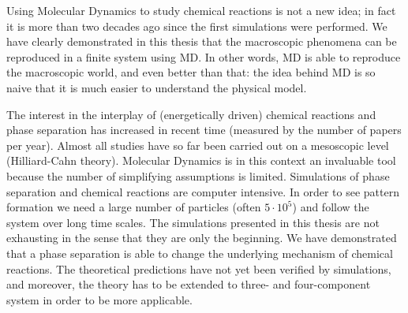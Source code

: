 Using Molecular Dynamics to study chemical reactions is not a new idea;
in fact it is more than two decades ago since the first simulations were
performed. We have clearly demonstrated in this thesis that the
macroscopic phenomena can be reproduced in a finite system using MD. In
other words, MD is able to reproduce the macroscopic world, and even
better than that: the idea behind MD is so naive that it is much
easier to understand the physical model.


The interest in the interplay of (energetically driven) chemical
reactions and phase separation has increased in recent time (measured
by the number of papers per year). Almost all studies have so far been
carried out on a mesoscopic level (Hilliard-Cahn theory). Molecular
Dynamics is in this context an invaluable tool because the number of
simplifying assumptions is limited. Simulations of phase separation and
chemical reactions are computer intensive. In order to see pattern
formation we need a large number of particles (often $5\cdot 10^5$)
and follow the system over long time scales. The simulations
presented in this thesis are not exhausting in the sense that they are
only the beginning. We have demonstrated that a phase separation is able to
change the underlying mechanism of chemical reactions. The theoretical
predictions have not yet been verified by simulations, and moreover,
the theory has to be extended to three- and four-component system in
order to be more applicable.
